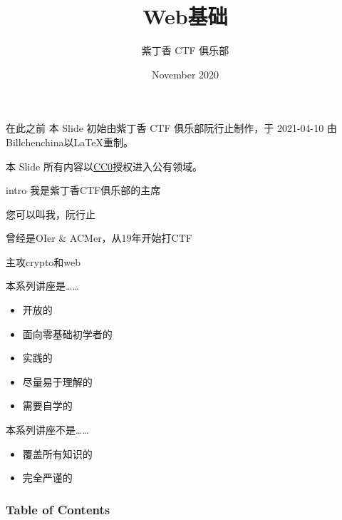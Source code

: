 \documentclass[UTF8]{ctexbeamer}
\title{Web基础}
\author{紫丁香 CTF 俱乐部}
\date[Nov 2020]{November 2020}
\begin{document}
\frame{\titlepage}
\begin{frame}{在此之前}
    本 Slide 初始由紫丁香 CTF 俱乐部阮行止制作，于 2021-04-10 由Billchenchina以LaTeX重制。
    
    本 Slide 所有内容以\href{https://creativecommons.org/share-your-work/public-domain/cc0/}{CC0}授权进入公有领域。
\end{frame}
\begin{frame}{intro}
我是紫丁香CTF俱乐部的主席

您可以叫我，阮行止

曾经是OIer \& ACMer，从19年开始打CTF

主攻crypto和web

\end{frame}

\begin{frame}{本系列讲座是……}
    \begin{itemize}
        \item 开放的
        \item 面向零基础初学者的
        \item 实践的
        \item 尽量易于理解的
        \item 需要自学的
    \end{itemize}
\end{frame}
\begin{frame}{本系列讲座不是……}
    \begin{itemize}
        \item 覆盖所有知识的
        \item 完全严谨的
    \end{itemize}
\end{frame}


\begin{frame}
	\frametitle{Table of Contents}
	\tableofcontents
\end{frame}
\end{document}
